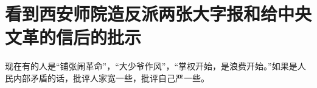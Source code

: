 \section[看到西安师院造反派两张大字报和给中央文革的信后的批示（一九六七年六月）]{看到西安师院造反派两张大字报和给中央文革的信后的批示}


现在有的人是“铺张闹革命”，“大少爷作风”，“掌权开始，是浪费开始。”如果是人民内部矛盾的话，批评人家宽一些，批评自己严一些。

